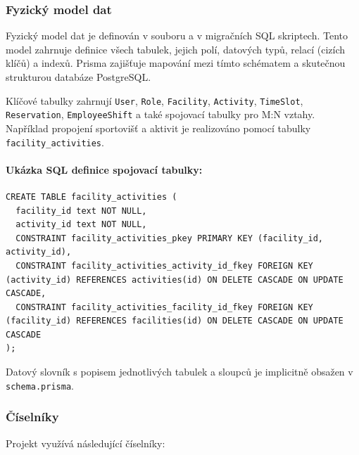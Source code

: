 \documentclass[12pt, a4paper]{article}
\begin{document}
\subsubsection{Fyzický model dat}
\label{subsubsec:fyzicky_model}

Fyzický model dat je definován v souboru  a v migračních SQL skriptech. Tento model zahrnuje definice všech tabulek, jejich polí, datových typů, relací (cizích klíčů) a indexů. Prisma zajišťuje mapování mezi tímto schématem a skutečnou strukturou databáze PostgreSQL.

Klíčové tabulky zahrnují
\texttt{User},
\texttt{Role},
\texttt{Facility},
\texttt{Activity},
\texttt{Time\-Slot},
\texttt{Reservation},
\texttt{Employee\-Shift}
a také spojovací tabulky pro M:N vztahy. Například propojení sportovišť a aktivit je realizováno pomocí tabulky \texttt{facility\_activities}.

\paragraph{Ukázka SQL definice spojovací tabulky:}
\begin{lstlisting}
CREATE TABLE facility_activities (
  facility_id text NOT NULL,
  activity_id text NOT NULL,
  CONSTRAINT facility_activities_pkey PRIMARY KEY (facility_id, activity_id),
  CONSTRAINT facility_activities_activity_id_fkey FOREIGN KEY (activity_id) REFERENCES activities(id) ON DELETE CASCADE ON UPDATE CASCADE,
  CONSTRAINT facility_activities_facility_id_fkey FOREIGN KEY (facility_id) REFERENCES facilities(id) ON DELETE CASCADE ON UPDATE CASCADE
);
\end{lstlisting}

Datový slovník s popisem jednotlivých tabulek a sloupců je implicitně obsažen v \texttt{schema.prisma}.

\subsubsection{Číselníky}
\label{subsubsec:ciselniky}

Projekt využívá následující číselníky:
\end{document}
